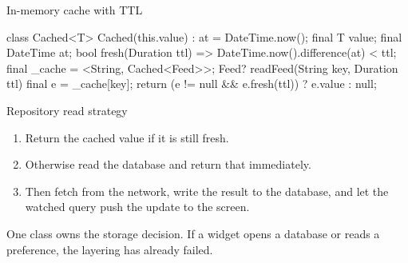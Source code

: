 \documentclass[10pt,aspectratio=169,t]{beamer}
\begin{document}
\begin{frame}[fragile,eyebrow=Storage]{In-memory cache with TTL}
\begin{dart}
class Cached<T> {
  Cached(this.value) : at = DateTime.now();
  final T value;
  final DateTime at;
  bool fresh(Duration ttl) => DateTime.now().difference(at) < ttl;
}
final _cache = <String, Cached<Feed>>{};
Feed? readFeed(String key, Duration ttl) {
  final e = _cache[key];
  return (e != null && e.fresh(ttl)) ? e.value : null;
}
\end{dart}
  \vskip 1mm
\end{frame}

\begin{frame}[eyebrow=Storage]{Repository read strategy}
  \vskip 2mm
  \begin{enumerate}
    \item Return the cached value if it is still fresh. 
    \item Otherwise read the database and return that immediately. 
    \item Then fetch from the network, write the result to the database, and let the watched query push the update to the screen.
  \end{enumerate}
  \vskip 3mm
  \begin{takeaway}{One class owns the storage decision.}
    If a widget opens a database or reads a preference, the layering has already failed.
  \end{takeaway}
\end{frame}

\end{document}
